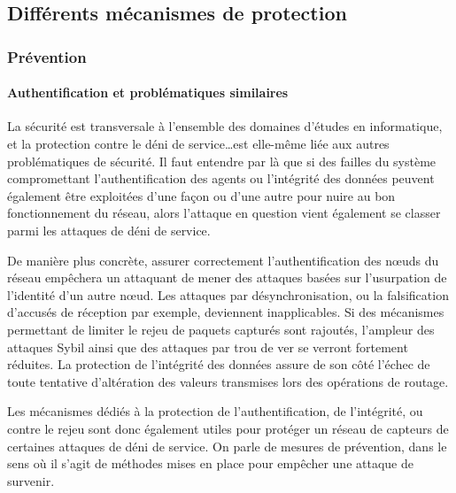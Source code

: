 \subsection{Différents mécanismes de protection}

\subsubsection{Prévention}
    \paragraph{Authentification et problématiques similaires}
La sécurité est transversale à l'ensemble des domaines d'études en informatique, et la protection contre le déni de service\dots est elle-même liée aux autres problématiques de sécurité.
Il faut entendre par là que si des failles du système compromettant l'authentification des agents ou l'intégrité des données peuvent également être exploitées d'une façon ou d'une autre pour nuire au bon fonctionnement du réseau, alors l'attaque en question vient également se classer parmi les attaques de déni de service.

De manière plus concrète, assurer correctement l'authentification des nœuds du réseau empêchera un attaquant de mener des attaques basées sur l'usurpation de l'identité d'un autre nœud.
Les attaques par désynchronisation, ou la falsification d'accusés de réception par exemple, deviennent inapplicables.
Si des mécanismes permettant de limiter le rejeu de paquets capturés sont rajoutés, l'ampleur des attaques Sybil ainsi que des attaques par trou de ver se verront fortement réduites.
La protection de l'intégrité des données assure de son côté l'échec de toute tentative d'altération des valeurs transmises lors des opérations de routage.

Les mécanismes dédiés à la protection de l'authentification, de l'intégrité, ou contre le rejeu sont donc également utiles pour protéger un réseau de capteurs de certaines attaques de déni de service.
On parle de mesures de prévention, dans le sens où il s'agit de méthodes mises en place pour empêcher une attaque de survenir.



